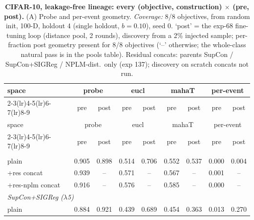 \begin{landscape}
\begin{center}
\footnotesize
\setlength{\tabcolsep}{3pt}
\begin{longtable}{lcccccccc}
\caption{\textbf{CIFAR-10, leakage-free lineage: every (objective, construction) $\times$ (pre, post).} (A) Probe and per-event geometry. \emph{Coverage:} 8/8 objectives, from random init, 100-D, holdout 4 (single holdout, $b=0.10$), seed 0. `post' = the exp-68 fine-tuning loop (distance pool, 2 rounds), discovery from a 2\% injected sample; per-fraction post geometry present for 8/8 objectives (`--' otherwise; the whole-class natural pass is in the pools table). Residual concats: parents SupCon / SupCon+SIGReg / NPLM-dist.\ only (exp 137); discovery on scratch concats not run.}\label{tab:grid_cifar10_scratch_a}\\
\toprule
space & \multicolumn{2}{c}{probe} & \multicolumn{2}{c}{eucl} & \multicolumn{2}{c}{mahaT} & \multicolumn{2}{c}{per-event} \\
\cmidrule(lr){2-3}\cmidrule(lr){4-5}\cmidrule(lr){6-7}\cmidrule(lr){8-9}
& pre & post & pre & post & pre & post & pre & post \\
\midrule
\endfirsthead
\toprule
space & \multicolumn{2}{c}{probe} & \multicolumn{2}{c}{eucl} & \multicolumn{2}{c}{mahaT} & \multicolumn{2}{c}{per-event} \\
\cmidrule(lr){2-3}\cmidrule(lr){4-5}\cmidrule(lr){6-7}\cmidrule(lr){8-9}
& pre & post & pre & post & pre & post & pre & post \\
\midrule
\endhead
\bottomrule
\endfoot
\multicolumn{9}{l}{\emph{SupCon}} \\
\quad plain & 0.905 & 0.898 & 0.514 & 0.706 & 0.552 & 0.537 & 0.000 & 0.004 \\
\quad +res concat & 0.939 & -- & 0.571 & -- & 0.567 & -- & 0.001 & -- \\
\quad +res-nplm concat & 0.916 & -- & 0.576 & -- & 0.585 & -- & 0.000 & -- \\
\multicolumn{9}{l}{\emph{SupCon+SIGReg ($\lambda$5)}} \\
\quad plain & 0.884 & 0.921 & 0.439 & 0.689 & 0.454 & 0.363 & 0.013 & 0.270 \\

\end{longtable}
\end{center}
\end{landscape}
